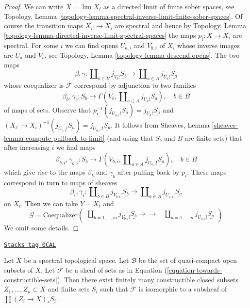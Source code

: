 \begin{proof}
We can write $X = \lim X_i$ as a directed limit
of finite sober spaces, see Topology, Lemma
\ref{topology-lemma-spectral-inverse-limit-finite-sober-spaces}.
Of course the transition maps $X_{i'} \to X_i$ are spectral and hence
by Topology, Lemma \ref{topology-lemma-directed-inverse-limit-spectral-spaces}
the maps $p_i : X \to X_i$ are spectral.
For some $i$ we can find opens $U_{a, i}$ and $V_{b, i}$
of $X_i$ whose inverse images are $U_a$ and $V_b$, see
Topology, Lemma \ref{topology-lemma-descend-opens}.
The two maps
$$
\beta, \gamma :
\coprod\nolimits_{b \in B} j_{V_b!}\underline{S_b}
\longrightarrow
\coprod\nolimits_{a \in A} j_{U_a!}\underline{S_a}
$$
whose coequalizer is $\mathcal{F}$ correspond by adjunction to two families
$$
\beta_b, \gamma_b :
S_b
\longrightarrow
\Gamma(V_b, \coprod\nolimits_{a \in A} j_{U_a!}\underline{S_a}), \quad
b \in B
$$
of maps of sets. Observe that
$p_i^{-1}(j_{U_{a, i}!}\underline{S_a}) = j_{U_a!}\underline{S_a}$
and $(X_{i'} \to X_i)^{-1}(j_{U_{a, i}!}\underline{S_a}) =
j_{U_{a, i'}!}\underline{S_a}$. It follows from
Sheaves, Lemma \ref{sheaves-lemma-compute-pullback-to-limit}
(and using that $S_b$ and $B$ are finite sets) that
after increasing $i$ we find maps
$$
\beta_{b, i}, \gamma_{b, i} :
S_b
\longrightarrow
\Gamma(V_{b, i}, \coprod\nolimits_{a \in A} j_{U_{a, i}!}\underline{S_a})
, \quad b \in B
$$
which give rise to the maps $\beta_b$ and $\gamma_b$ after pulling
back by $p_i$. These maps correspond in turn to maps of sheaves
$$
\beta_i, \gamma_i :
\coprod\nolimits_{b \in B} j_{V_{b, i}!}\underline{S_b}
\longrightarrow
\coprod\nolimits_{a \in A} j_{U_{a, i}!}\underline{S_a}
$$
on $X_i$. Then we can take $Y = X_i$ and
$$
\mathcal{G} =
\text{Coequalizer}\left(
\begin{array}{cc}\coprod\nolimits_{b = 1, \ldots, m} j_{V_{b, i}!}\underline{S_b}
\longrightarrow\longrightarrow & \coprod\nolimits_{a = 1, \ldots, n} j_{U_{a, i}!}\underline{S_a}\end{array}
\right)
$$
We omit some details.
\end{proof}

\begin{lemma}
\label{modules-lemma-constructible-in-constant}
\href{https://stacks.math.columbia.edu/tag/0CAL}{\texttt{Stacks tag 0CAL}}

Let $X$ be a spectral topological space. Let $\mathcal{B}$ be
the set of quasi-compact open subsets of $X$.
Let $\mathcal{F}$ be a sheaf of sets as in
Equation (\ref{equation-towards-constructible-sets}).
Then there exist finitely many constructible closed subsets
$Z_1, \ldots, Z_n \subset X$ and finite sets $S_i$
such that $\mathcal{F}$ is isomorphic to a subsheaf of
$\prod (Z_i \to X)_*\underline{S_i}$.
\end{lemma}

